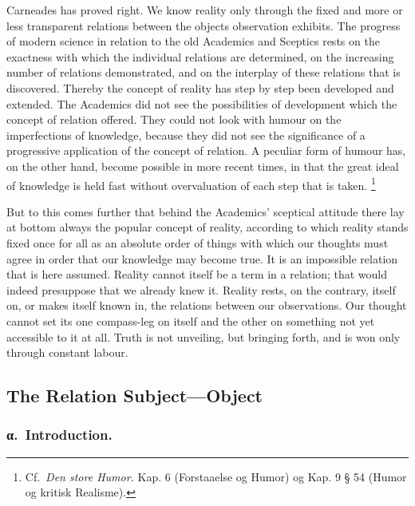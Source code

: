 \documentclass[12pt]{article}
\newcommand{\opage}[1]{\marginnote{\footnotesize\textit{[#1]}}}
\begin{document}
Carneades has proved right. We know reality only \opage{57}through the fixed and more
or less transparent relations between the objects observation exhibits. The
progress of modern science in relation to the old Academics and Sceptics
rests on the exactness with which the individual relations are determined,
on the increasing number of relations demonstrated, and on the interplay of
these relations that is discovered. Thereby the concept of reality has step
by step been developed and extended. The Academics did not see the
possibilities of development which the concept of relation offered. They
could not look with humour on the imperfections of knowledge, because they
did not see the significance of a progressive application of the concept of
relation. A peculiar form of humour has, on the other hand, become possible
in more recent times, in that the great ideal of knowledge is held fast
without overvaluation of each step that is taken.%
\footnote{Cf.\ \textit{Den store Humor.} Kap. 6 (Forstaaelse og Humor) og
Kap. 9 § 54 (Humor og kritisk Realisme).}

But to this comes further that behind the Academics' sceptical attitude
there lay at bottom always the popular concept of reality, according to
which reality stands fixed once for all as an absolute order of things with
which our thoughts must agree in order that our knowledge may become true.
It is an impossible relation that is here assumed. Reality cannot itself be
a term in a relation; that would indeed presuppose that we already knew it.
Reality rests, on the contrary, itself on, or makes itself known in, the
relations between our observations. Our thought cannot set its one
compass-leg on itself and the other on something not yet accessible to it at
all. Truth is not unveiling, but bringing forth, and is won only through
constant labour.

\subsection{The Relation Subject---Object}
\label{sec:3d}

\subsubsection*{α.~Introduction.}
%
\label{sec:3d-alpha}%
\end{document}
